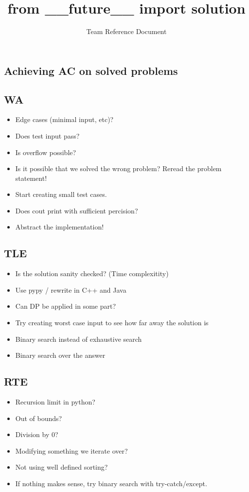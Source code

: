 \documentclass[8pt,a4paper,landscape,oneside]{amsart}
\title{from \_\_future\_\_ import solution}
\subtitle{Team Reference Document}
\author{}
\date{\ddmmyyyydate{\today{}}}
\begin{document}
\begin{multicols*}{2}
\maketitle
\thispagestyle{fancy}
\vspace{-3em}

\tableofcontents
\begin{large}
\section{Achieving AC on solved problems}
\subsection{WA}
\begin{itemize}
    \item Edge cases (minimal input, etc)?
    \item Does test input pass?
    \item Is overflow possible?
    \item Is it possible that we solved the wrong problem? Reread the problem statement!
    \item Start creating small test cases.
    \item Does cout print with sufficient percision?
    \item Abstract the implementation!
\end{itemize}
\subsection{TLE}
\begin{itemize}
    \item Is the solution sanity checked? (Time complexitity)
    \item Use pypy / rewrite in C++ and Java
    \item Can DP be applied in some part?
    \item Try creating worst case input to see how far away the solution is
    \item Binary search instead of exhaustive search
    \item Binary search over the answer
\end{itemize}
\subsection{RTE}
\begin{itemize}
    \item Recursion limit in python?
    \item Out of bounds?
    \item Division by 0?
    \item Modifying something we iterate over?
    \item Not using well defined sorting?
    \item If nothing makes sense, try binary search with try-catch/except.
\end{itemize}

\end{large}
\end{multicols*}
\end{document}
